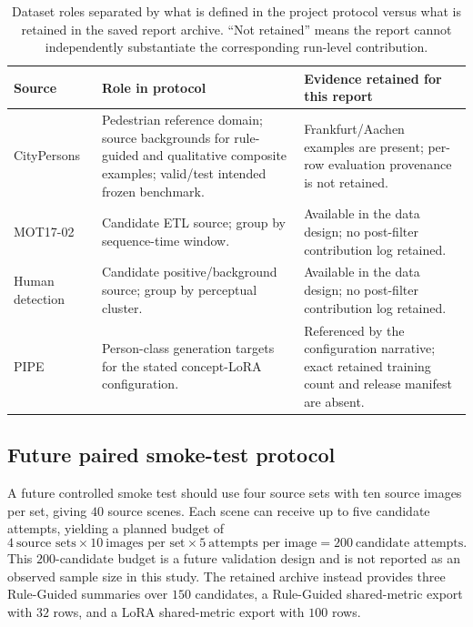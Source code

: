 \documentclass[11pt,a4paper]{article}
\begin{document}
\begin{table}[t]
  \centering
  \caption[Dataset roles and evidence status]{Dataset roles separated by what is
  defined in the project protocol versus what is retained in the saved report
  archive. ``Not retained'' means the report cannot independently substantiate the
  corresponding run-level contribution.}
  \label{tab:dataset}
  \small
  \begin{tabular}{@{}p{2.8cm}p{3.5cm}p{3.8cm}@{}}
    \toprule
    Source & Role in protocol & Evidence retained for this report \\
    \midrule
    CityPersons~\cite{citypersons} & Pedestrian reference domain; source backgrounds for rule-guided and qualitative composite examples; valid/test intended frozen benchmark. & Frankfurt/Aachen examples are present; per-row evaluation provenance is not retained. \\
    MOT17-02 & Candidate ETL source; group by sequence-time window. & Available in the data design; no post-filter contribution log retained. \\
    Human detection & Candidate positive/background source; group by perceptual cluster. & Available in the data design; no post-filter contribution log retained. \\
    PIPE~\cite{pipe} & Person-class generation targets for the stated concept-LoRA configuration. & Referenced by the configuration narrative; exact retained training count and release manifest are absent. \\
    \bottomrule
  \end{tabular}
\end{table}
\subsection{Future paired smoke-test protocol}\label{sec:smoke-plan}
A future controlled smoke test should use four source sets with ten source images per set, giving $40$ source scenes. Each scene can receive up to five candidate attempts, yielding a planned budget of
\begin{equation}
  4\ \text{source sets}\times 10\ \text{images per set}\times 5\ \text{attempts per image}=200\ \text{candidate attempts}.
\end{equation}
This $200$-candidate budget is a future validation design and is not reported as an observed sample size in this study. The retained archive instead provides three Rule-Guided summaries over $150$ candidates, a Rule-Guided shared-metric export with $32$ rows, and a LoRA shared-metric export with $100$ rows.
\end{document}
